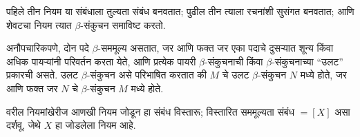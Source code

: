 \documentclass[../../../include/open-logic-section]{subfiles}
\begin{document}
पहिले तीन नियम या संबंधाला तुल्यता संबंध बनवतात;
पुढील तीन त्याला रचनांशी सुसंगत बनवतात; आणि शेवटचा
नियम त्यात $\beta$-संकुचन समाविष्ट करतो.

अनौपचारिकपणे, दोन पदे $\beta$-सममूल्य असतात, जर आणि फक्त जर
एका पदाचे दुसऱ्यात शून्य किंवा अधिक पायऱ्यांनी
परिवर्तन करता येते, आणि प्रत्येक पायरी $\beta$-संकुचनाची
किंवा $\beta$-संकुचनाच्या ``उलट'' प्रकारची असते.
उलट $\beta$-संकुचन
असे परिभाषित करतात की $M$ चे उलट $\beta$-संकुचन
 $N$ मध्ये होते, जर आणि फक्त जर $N$ चे $\beta$-संकुचन $M$
मध्ये होते.

वरील नियमांखेरीज आणखी नियम जोडून हा संबंध विस्तारू;
विस्तारित सममूल्यता संबंध $\equal[X]$ असा दर्शवू,
जेथे $X$ हा जोडलेला नियम आहे.
\end{document}
